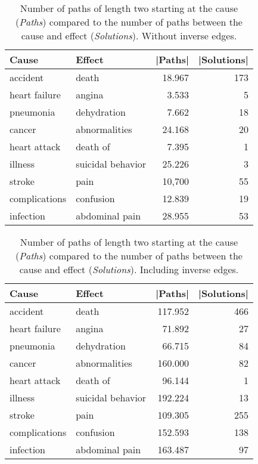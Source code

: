 \begin{table}
\caption{Number of paths of length two starting at the cause (\textit{Paths}) compared to
		 the number of paths between the cause and effect (\textit{Solutions}). Without 
		 inverse edges.}
\label{table-path-complexity}
\centering
\begin{tabular}{llrr} 
			\toprule
			\textbf{Cause} & \textbf{Effect} & \textbf{|Paths|} & \textbf{|Solutions|}\\
			\toprule
		   accident & death & 18.967 & 173 \\
		   heart failure & angina &	3.533 &	5	\\
		   pneumonia & dehydration &	7.662 &	18	\\
		   cancer & abnormalities &	24.168 &	20	\\
		   heart attack & death of & 7.395 &	1	\\
		   illness & suicidal behavior & 25.226 &	3	\\
		   stroke  & pain	& 10,700 & 55 \\
		   complications & confusion & 12.839 &	19	\\
		   infection & abdominal pain &28.955 &	53	\\
			\bottomrule
\end{tabular}
\end{table}
\begin{table}
\caption{Number of paths of length two starting at the cause (\textit{Paths}) compared to
		 the number of paths between the cause and effect (\textit{Solutions}). Including 
		 inverse edges.}
\label{table-path-complexity-inverse}
\centering
\begin{tabular}{llrr} 
			\toprule
			\textbf{Cause} & \textbf{Effect} & \textbf{|Paths|} & \textbf{|Solutions|} \\
			\toprule
		   accident & death & 117.952 & 466 \\
		   heart failure & angina &	71.892 &	27	\\
		   pneumonia & dehydration &	66.715 &	84	\\
		   cancer & abnormalities &	160.000 &	82	\\
		   heart attack & death of & 96.144 &	1	\\
		   illness & suicidal behavior & 192.224 &	13	\\
		   stroke  & pain	& 109.305 & 255 \\
		   complications & confusion & 152.593 & 138 \\
		   infection & abdominal pain & 163.487 &	97	\\
			\bottomrule
\end{tabular}
\end{table}
